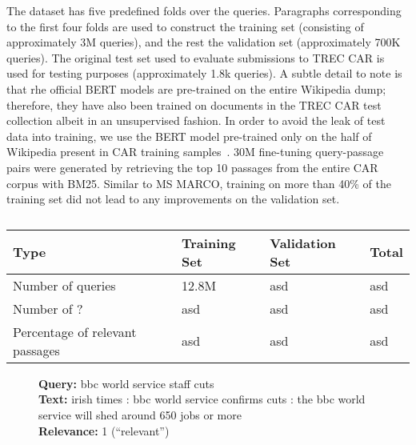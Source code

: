 The dataset has five predefined folds over the  queries.
Paragraphs corresponding to the first four folds are used to construct the training set (consisting of approximately 3M queries), and the rest the validation set (approximately 700K queries).
The original test set used to evaluate submissions to TREC CAR is used for testing purposes (approximately 1.8k queries).
A subtle detail to note is that rhe official BERT models are pre-trained on the entire Wikipedia dump; therefore, they have also been trained on documents in the TREC CAR test collection albeit in an unsupervised fashion.
In order to avoid the leak of test data into training, we use the BERT model pre-trained only on the half of Wikipedia present in CAR training samples~\cite{}.
30M fine-tuning query-passage pairs were generated by retrieving the top 10 passages from the entire CAR corpus with BM25.
Similar to MS MARCO, training on more than 40\% of the training set did not lead to any improvements on the validation set.

\begin{table}[b]
\vspace{0.2cm}
\centering
\begin{tabular}{llll}
\toprule
\textbf{Type} \mbox{\hspace{0.5cm}} & \textbf{Training Set} \mbox{\hspace{1.0cm}} & \textbf{Validation Set} \mbox{\hspace{1.0cm}} & \textbf{Total} \mbox{\hspace{1.0cm}} \\
\toprule
Number of queries & 12.8M & asd & asd \\
Number  of ? & asd & asd & asd \\
Percentage of relevant passages  & asd      & asd & asd   \\
\bottomrule
\end{tabular}
\vspace{0.2cm}
\caption{}
\label{tab:car-stats}
\vspace{-0.6cm}
\end{table}

\begin{figure}[b!]
	\begin{framed}
		\centering
    		\textbf{Query:} bbc world service staff cuts \\
    		\textbf{Text:} irish times : bbc world service confirms cuts : the bbc world service will shed around 650 jobs or more \\
    		\textbf{Relevance:} 1 (``relevant'')
	\end{framed}
\label{car-example}
 \caption{}
\end{figure}


